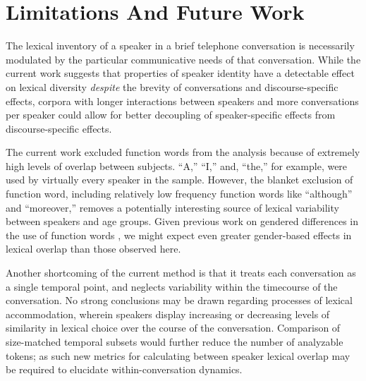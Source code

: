 \documentclass[10pt,letterpaper]{article}
\begin{document}
\section{Limitations And Future Work}
The lexical inventory of a speaker in a brief telephone conversation is necessarily modulated by the particular communicative needs of that conversation. While the current work suggests that properties of speaker identity have a detectable effect on lexical diversity \textit{despite} the brevity of conversations and discourse-specific effects, corpora with longer interactions between speakers and more conversations per speaker could allow for better decoupling of speaker-specific effects from discourse-specific effects.

The current work excluded function words from the analysis because of extremely high levels of overlap between subjects. ``A,'' ``I,'' and, ``the,'' for example, were used by virtually every speaker in the sample. However, the blanket exclusion of function word, including relatively low frequency function words like ``although'' and ``moreover,''  removes a potentially interesting source of lexical variability between speakers and age groups. Given previous work on gendered differences in the use of function words \citep{newmanEtAl2008}, we might expect even greater gender-based effects in lexical overlap than those observed here.


Another shortcoming of the current method is that it treats each conversation as a single temporal point, and neglects variability within the timecourse of the conversation.
No strong conclusions may be drawn regarding processes of lexical accommodation, wherein speakers display increasing or decreasing levels of similarity in lexical choice over the course of the conversation.
Comparison of size-matched temporal subsets would further reduce the number of analyzable tokens; as such new metrics for calculating between speaker lexical overlap may be required to elucidate within-conversation dynamics.
\end{document}
